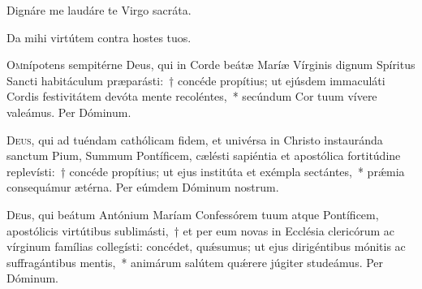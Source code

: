 \documentclass[vesperale_romanum.tex]{subfiles}
\begin{document}
 


\vv Dignáre me laudáre te Virgo sacráta. %

\rr Da mihi virtútem contra hostes tuos.


\oratio
\lettrine{O}{m}nípotens sempitérne Deus, qui in Corde beátæ Maríæ Vírginis dignum Spíritus Sancti habitáculum præparásti:~† concéde propítius; ut ejúsdem immaculáti Cordis festivitátem devóta mente recoléntes,~* secúndum Cor tuum vívere valeámus. Per Dóminum.






\duplexmtv

\oratio
\lettrine{D}{eus}, qui ad tuéndam cathólicam fidem, et univérsa in Christo instauránda sanctum Pium, Summum Pontíficem, cælésti sapiéntia et apostólica fortitúdine replevísti:~† concéde propítius; ut ejus institúta et exémpla se\-ctántes,~* prǽmia consequámur ætérna.
Per eúmdem Dóminum nostrum.

 

 
\oratio
\lettrine{D}{e}us,  qui beátum Antónium Maríam Confessórem tuum atque Pontíficem, apostólicis virtútibus sublimásti,~† et per eum novas in Ecclésia clericórum ac vírginum famílias collegísti: concédet, quǽsumus; ut ejus dirigéntibus mónitis ac suffragántibus mentis,~* animárum salútem quǽrere júgiter studeámus.
Per Dóminum.
\end{document}
